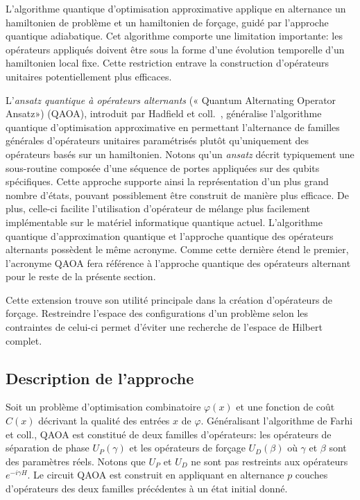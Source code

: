 L'algorithme quantique d'optimisation approximative applique en alternance un hamiltonien de problème et un hamiltonien de forçage, guidé par l'approche quantique adiabatique. Cet algorithme comporte une limitation importante: les opérateurs appliqués doivent être sous la forme d'une évolution temporelle d'un hamiltonien local fixe. Cette restriction entrave la construction d'opérateurs unitaires potentiellement plus efficaces.

L'\textit{ansatz quantique à opérateurs alternants} (« Quantum Alternating Operator Ansatz») (QAOA), introduit par Hadfield et coll.~\cite{hadfieldQuantumApproximateOptimization2019}, généralise l'algorithme quantique d'optimisation approximative en permettant l'alternance de familles générales d'opérateurs unitaires paramétrisés plutôt qu'uniquement des opérateurs basés sur un hamiltonien. Notons qu'un \textit{ansatz} décrit typiquement une sous-routine composée d'une séquence de portes appliquées sur des qubits spécifiques. Cette approche supporte ainsi la représentation d'un plus grand nombre d'états, pouvant possiblement être construit de manière plus efficace. De plus, celle-ci facilite l'utilisation d'opérateur de mélange plus facilement implémentable sur le matériel informatique quantique actuel. L'algorithme quantique d'approximation quantique et l'approche quantique des opérateurs alternants possèdent le même acronyme. Comme cette dernière étend le premier, l'acronyme QAOA fera référence à l'approche quantique des opérateurs alternant pour le reste de la présente section.

Cette extension trouve son utilité principale dans la création d'opérateurs de forçage. Restreindre l'espace des configurations d'un problème selon les contraintes de celui-ci permet d'éviter une recherche de l'espace de Hilbert complet.



\subsection{Description de l'approche}

Soit un problème d'optimisation combinatoire $\varphi(x)$ et une fonction de coût $C(x)$ décrivant la qualité des entrées $x$ de $\varphi$. Généralisant l'algorithme de Farhi et coll., QAOA est constitué de deux familles d'opérateurs: les opérateurs de séparation de phase $U_{P}(\gamma)$ et les opérateurs de forçage $U_{D}(\beta)$ où $\gamma$ et $\beta$ sont des paramètres réels. Notons que $U_{P}$ et $U_{D}$ ne sont pas restreints aux opérateurs $e^{-i \gamma H}$. Le circuit QAOA est construit en appliquant en alternance $p$ couches d'opérateurs des deux familles précédentes à un état initial donné.
        
